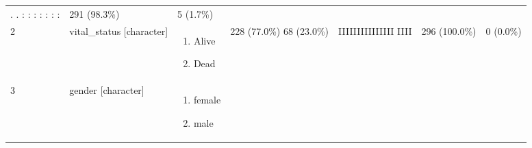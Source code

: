 \documentclass[
]{article}
\providecommand{\tightlist}{%
  \setlength{\itemsep}{0pt}\setlength{\parskip}{0pt}}
\begin{document}
\begin{longtable}[]{@{}lllllll@{}}
\begin{minipage}[t]{0.15\columnwidth}
. . : : : : : : :\strut
\end{minipage} & \begin{minipage}[t]{0.07\columnwidth}\raggedright
291
(98.3\%)\strut
\end{minipage} & \begin{minipage}[t]{0.07\columnwidth}\raggedright
5
(1.7\%)\strut
\end{minipage}\tabularnewline
\begin{minipage}[t]{0.03\columnwidth}\raggedright
2\strut
\end{minipage} & \begin{minipage}[t]{0.17\columnwidth}\raggedright
vital\_status
{[}character{]}\strut
\end{minipage} & \begin{minipage}[t]{0.17\columnwidth}\raggedright
\begin{enumerate}
\def\labelenumi{\arabic{enumi}.}
\tightlist
\item
  Alive
\item
  Dead
\end{enumerate}\strut
\end{minipage} & \begin{minipage}[t]{0.14\columnwidth}\raggedright
228 (77.0\%)
68 (23.0\%)\strut
\end{minipage} & \begin{minipage}[t]{0.15\columnwidth}\raggedright
IIIIIIIIIIIIIII
IIII\strut
\end{minipage} & \begin{minipage}[t]{0.07\columnwidth}\raggedright
296
(100.0\%)\strut
\end{minipage} & \begin{minipage}[t]{0.07\columnwidth}\raggedright
0
(0.0\%)\strut
\end{minipage}\tabularnewline
\begin{minipage}[t]{0.03\columnwidth}\raggedright
3\strut
\end{minipage} & \begin{minipage}[t]{0.17\columnwidth}\raggedright
gender
{[}character{]}\strut
\end{minipage} & \begin{minipage}[t]{0.17\columnwidth}\raggedright
\begin{enumerate}
\def\labelenumi{\arabic{enumi}.}
\tightlist
\item
  female
\item
  male
\end{enumerate}\strut
\end{minipage} & \begin{minipage}[t]{0.14\columnwidth}\raggedright

\end{minipage}
\end{longtable}
\end{document}
